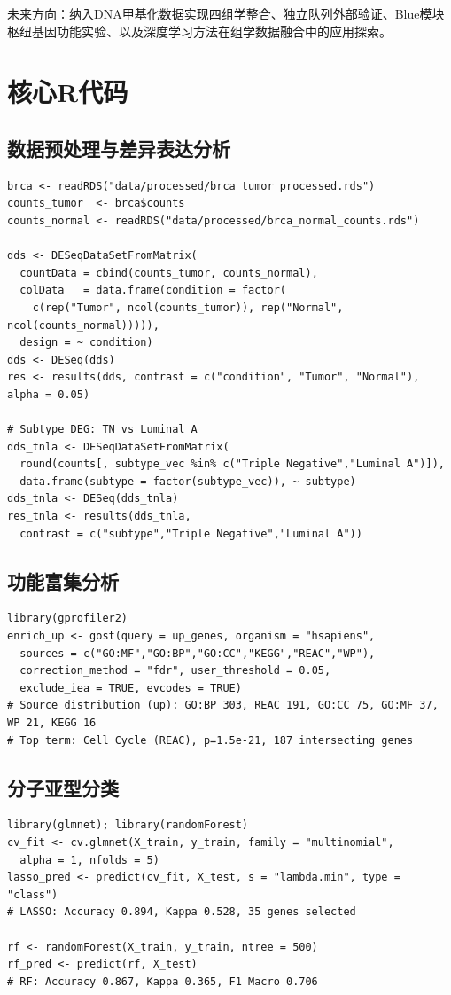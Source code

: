 \documentclass[12pt,a4paper,openany]{ctexbook}
\begin{document}
未来方向：纳入DNA甲基化数据实现四组学整合、独立队列外部验证、Blue模块枢纽基因功能实验、以及深度学习方法在组学数据融合中的应用探索。

\printbibliography

\newpage
\appendix
\chapter{核心R代码}

\section{数据预处理与差异表达分析}
\begin{lstlisting}[caption={mRNA预处理与DESeq2差异表达}, basicstyle=\ttfamily\scriptsize]
brca <- readRDS("data/processed/brca_tumor_processed.rds")
counts_tumor  <- brca$counts
counts_normal <- readRDS("data/processed/brca_normal_counts.rds")

dds <- DESeqDataSetFromMatrix(
  countData = cbind(counts_tumor, counts_normal),
  colData   = data.frame(condition = factor(
    c(rep("Tumor", ncol(counts_tumor)), rep("Normal", ncol(counts_normal))))),
  design = ~ condition)
dds <- DESeq(dds)
res <- results(dds, contrast = c("condition", "Tumor", "Normal"), alpha = 0.05)

# Subtype DEG: TN vs Luminal A
dds_tnla <- DESeqDataSetFromMatrix(
  round(counts[, subtype_vec %in% c("Triple Negative","Luminal A")]),
  data.frame(subtype = factor(subtype_vec)), ~ subtype)
dds_tnla <- DESeq(dds_tnla)
res_tnla <- results(dds_tnla,
  contrast = c("subtype","Triple Negative","Luminal A"))
\end{lstlisting}

\section{功能富集分析}
\begin{lstlisting}[caption={g:Profiler功能富集}, basicstyle=\ttfamily\scriptsize]
library(gprofiler2)
enrich_up <- gost(query = up_genes, organism = "hsapiens",
  sources = c("GO:MF","GO:BP","GO:CC","KEGG","REAC","WP"),
  correction_method = "fdr", user_threshold = 0.05,
  exclude_iea = TRUE, evcodes = TRUE)
# Source distribution (up): GO:BP 303, REAC 191, GO:CC 75, GO:MF 37, WP 21, KEGG 16
# Top term: Cell Cycle (REAC), p=1.5e-21, 187 intersecting genes
\end{lstlisting}

\section{分子亚型分类}
\begin{lstlisting}[caption={LASSO与随机森林分类}, basicstyle=\ttfamily\scriptsize]
library(glmnet); library(randomForest)
cv_fit <- cv.glmnet(X_train, y_train, family = "multinomial",
  alpha = 1, nfolds = 5)
lasso_pred <- predict(cv_fit, X_test, s = "lambda.min", type = "class")
# LASSO: Accuracy 0.894, Kappa 0.528, 35 genes selected

rf <- randomForest(X_train, y_train, ntree = 500)
rf_pred <- predict(rf, X_test)
# RF: Accuracy 0.867, Kappa 0.365, F1 Macro 0.706
\end{lstlisting}
\end{document}
